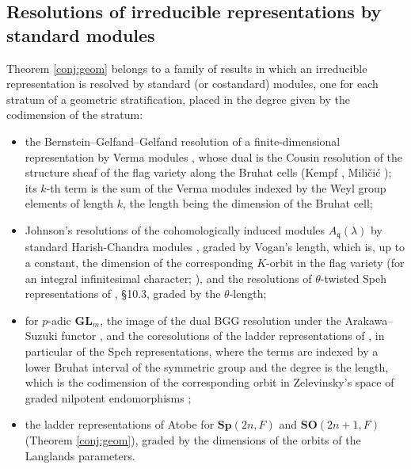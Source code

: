 \documentclass[a4paper,12pt,leqno]{amsart}
\theoremstyle{plain}
\theoremstyle{definition}
\begin{document}
\subsection*{Resolutions of irreducible representations by standard modules}
Theorem \ref{conj:geom} belongs to a family of results in which an irreducible representation is
resolved by standard (or costandard) modules, one for each stratum of a geometric stratification,
placed in the degree given by the codimension of the stratum:
\begin{itemize}
\item the Bernstein--Gelfand--Gelfand resolution of a finite-dimensional representation by Verma
modules \cite{BGG75}, whose dual is the Cousin resolution of the structure sheaf of the flag variety
along the Bruhat cells (Kempf \cite{Kem78}, Mili\v{c}i\'c \cite{Mil}); its $k$-th term is the sum of
the Verma modules indexed by the Weyl group elements of length $k$, the length being the dimension of
the Bruhat cell;
\item Johnson's resolutions of the cohomologically induced modules $A_\mathfrak{q}(\lambda)$ by
standard Harish-Chandra modules \cite{Joh84}, graded by Vogan's length, which is, up to a constant,
the dimension of the corresponding $K$-orbit in the flag variety (for an integral infinitesimal
character; \cite{LV83}), and the
resolutions of $\theta$-twisted Speh representations of \cite{AMR18}, \S10.3, graded by the
$\theta$-length;
\item for $p$-adic $\mathbf{GL}_m$, the image of the dual BGG resolution under the Arakawa--Suzuki
functor \cite{BC15}, and the coresolutions of the ladder representations of \cite{Ren26}, in particular
of the Speh representations, where the terms are indexed by a lower Bruhat interval of the symmetric
group and the degree is the length, which is the codimension of the corresponding orbit in
Zelevinsky's space of graded nilpotent endomorphisms \cite{Zel81};
\item the ladder representations of Atobe for $\mathbf{Sp}(2n,F)$ and $\mathbf{SO}(2n+1,F)$
(Theorem \ref{conj:geom}), graded by the dimensions of the orbits of the Langlands parameters.
\end{itemize}
\end{document}
